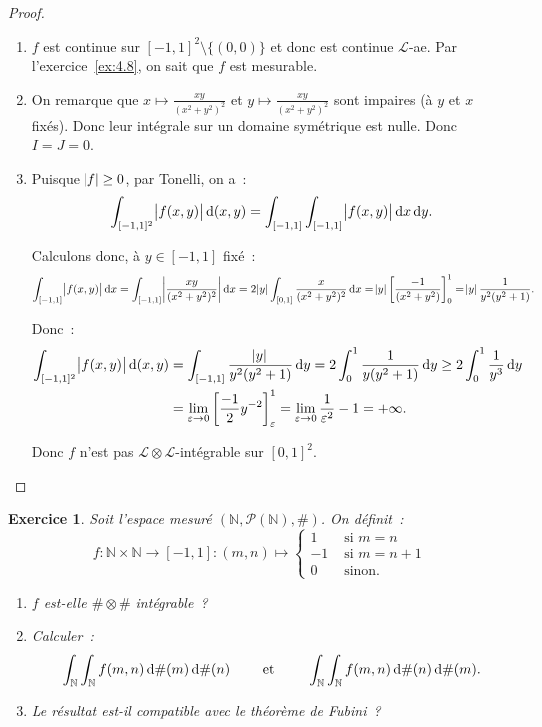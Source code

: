 \documentclass{article}
\newtheorem{ex}{Exercice}[section]
\theoremstyle{definition}
\newcommand{\pinfty}{{+\infty}}
\newcommand{\N}{{\mathbb N}}
\begin{document}
\begin{proof}~
\begin{enumerate}
	\item $f$ est continue sur $[-1, 1]^2 \setminus \{(0, 0)\}$ et donc est continue $\mathcal L$-ae. Par l'exercice~\ref{ex:4.8}, on sait que $f$ est mesurable.
	\item On remarque que $x \mapsto \frac {xy}{(x^2+y^2)^2}$ et $y \mapsto \frac {xy}{(x^2+y^2)^2}$ sont impaires (à $y$ et $x$ fixés). Donc leur intégrale sur un domaine
	symétrique est nulle. Donc $I = J = 0$.
	\item Puisque $\abs f \geq 0$, par Tonelli, on a~:
	\[\int_{[-1, 1]^2}\abs {f(x, y)}\dif\,(x,y) = \int_{[-1, 1]}\int_{[-1, 1]}\abs {f(x, y)}\dif x\dif y.\]

	Calculons donc, à $y \in [-1, 1]$ fixé~:
	\[\int_{[-1, 1]}\abs {f(x, y)}\dif x = \int_{[-1, 1]}\abs {\frac {xy}{(x^2+y^2)^2}}\dif x = 2\abs y\int_{[0, 1]}\frac x{(x^2+y^2)^2}\dif x
		= \abs y\left[\frac {-1}{(x^2+y^2)}\right]_0^1 = \abs y\frac 1{y^2(y^2+1)}.\]

	Donc~:
	\begin{align*}
		\int_{[-1, 1]^2}\abs {f(x, y)}\dif\,(x,y) &= \int_{[-1, 1]}\frac {\abs y}{y^2(y^2+1)}\dif y = 2\int_0^1\frac 1{y(y^2+1)}\dif y \geq 2\int_0^1\frac 1{y^3}\dif y \\
		&= \lim_{\varepsilon \to 0}\left[\frac {-1}2y^{-2}\right]_\varepsilon^1 = \lim_{\varepsilon \to 0}\frac 1{\varepsilon^2}-1 = \pinfty.
	\end{align*}

	Donc $f$ n'est pas $\mathcal L \otimes \mathcal L$-intégrable sur $[0, 1]^2$.
\end{enumerate}
\end{proof}

\begin{ex} Soit l'espace mesuré $(\N, \mathcal P(\N), \#)$. On définit~:
\[f : \N \times \N \to [-1, 1] : (m, n) \mapsto \begin{cases}1 &\text{ si } m = n\\-1 &\text{ si }m=n+1 \\0 &\text{ sinon.}\end{cases}\]
\begin{enumerate}
	\item $f$ est-elle $\# \otimes \#$ intégrable~?
	\item Calculer~:
	\[\int_\N\int_\N f(m, n)\dif\#(m)\dif\#(n) \qquad \text{ et } \qquad \int_\N\int_\N f(m, n)\dif\#(n)\dif\#(m).\]
	\item Le résultat est-il compatible avec le théorème de Fubini~?
\end{enumerate}
\end{ex}
\end{document}
